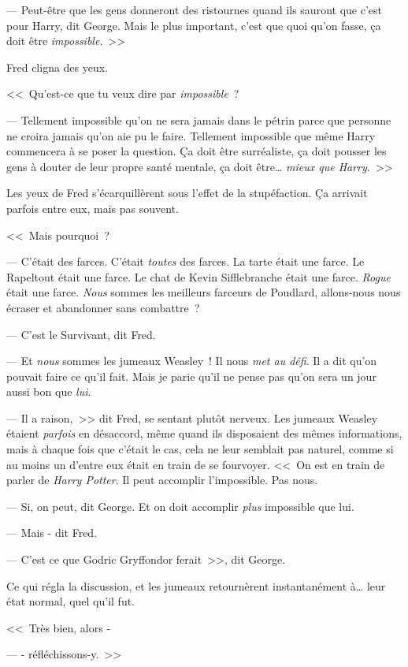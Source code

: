 --- Peut-être que les gens donneront des ristournes quand ils sauront que c'est pour Harry, dit George. Mais le plus important, c'est que quoi qu'on fasse, ça doit être \emph{impossible}.~>>

Fred cligna des yeux.

<<~Qu'est-ce que tu veux dire par \emph{impossible}~?

--- Tellement impossible qu'on ne sera jamais dans le pétrin parce que personne ne croira jamais qu'on aie pu le faire. Tellement impossible que même Harry commencera à se poser la question. Ça doit être surréaliste, ça doit pousser les gens à douter de leur propre santé mentale, ça doit être… \emph{mieux que Harry}.~>>

Les yeux de Fred s'écarquillèrent sous l'effet de la stupéfaction. Ça arrivait parfois entre eux, mais pas souvent.

<<~Mais pourquoi~?

--- C'était des farces. C'était \emph{toutes} des farces. La tarte était une farce. Le Rapeltout était une farce. Le chat de Kevin Sifflebranche était une farce. \emph{Rogue} était une farce. \emph{Nous} sommes les meilleurs farceurs de Poudlard, allons-nous nous écraser et abandonner sans combattre~?

--- C'est le Survivant, dit Fred.

--- Et \emph{nous} sommes les jumeaux Weasley~! Il nous \emph{met au défi}. Il a dit qu'on pouvait faire ce qu'il fait. Mais je parie qu'il ne pense pas qu'on sera un jour aussi bon que \emph{lui}.

--- Il a raison,~>> dit Fred, se sentant plutôt nerveux. Les jumeaux Weasley étaient \emph{parfois} en désaccord, même quand ils disposaient des mêmes informations, mais à chaque fois que c'était le cas, cela ne leur semblait pas naturel, comme si au moins un d'entre eux était en train de se fourvoyer. <<~On est en train de parler de \emph{Harry Potter}. Il peut accomplir l'impossible. Pas nous.

--- Si, on peut, dit George. Et on doit accomplir \emph{plus} impossible que lui.

--- Mais - dit Fred.

--- C'est ce que Godric Gryffondor ferait~>>, dit George.

Ce qui régla la discussion, et les jumeaux retournèrent instantanément à… leur état normal, quel qu'il fut.

<<~Très bien, alors -

--- - réfléchissons-y.~>> 

